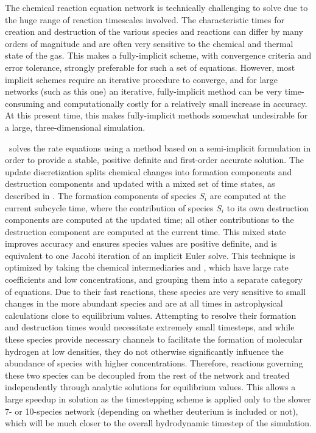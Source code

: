 The chemical reaction equation network is technically challenging to solve due
to the huge range of reaction timescales involved.  The characteristic times
for creation and destruction of the various species and reactions can differ by
many orders of magnitude and are often very sensitive to the chemical and
thermal state of the gas.  This makes a fully-implicit scheme, with convergence
criteria and error tolerance, strongly preferable for such a set of equations.
However, most implicit schemes require an iterative procedure to converge, and
for large networks (such as this one) an iterative, fully-implicit method can
be very time-consuming and computationally costly for a relatively small
increase in accuracy.  At this present time, this makes fully-implicit methods
somewhat undesirable for a large, three-dimensional simulation.

\enzo\ solves the rate equations using a method based on a semi-implicit
formulation in order to provide a stable, positive definite and first-order
accurate solution.  The update discretization splits chemical changes into
formation components and destruction components and updated with a mixed set of
time states, as described in \citet{anninos97}.  The formation components of
species $S_i$ are computed at the current subcycle time, where the contribution
of species $S_i$ to its own destruction components are computed at the updated
time; all other contributions to the destruction component are computed at the
current time.  This mixed state improves accuracy and ensures species values
are positive definite, and is equivalent to one Jacobi iteration of an implicit
Euler solve.  This technique is optimized by taking the chemical intermediaries
\Hm and \HHp, which have large rate coefficients and low concentrations, and
grouping them into a separate category of equations.  Due to their fast
reactions, these species are very sensitive to small changes in the more
abundant species and are at all times in astrophysical calculations close to
equilibrium values.  Attempting to resolve their formation and destruction
times would necessitate extremely small timesteps, and while these species
provide necessary channels to facilitate the formation of molecular hydrogen at
low densities, they do not otherwise significantly influence the abundance of
species with higher concentrations.  Therefore, reactions governing these two
species can be decoupled from the rest of the network and treated independently
through analytic solutions for equilibrium values.  This allows a large speedup
in solution as the timestepping scheme is applied only to the slower 7- or
10-species network (depending on whether deuterium is included or not), which
will be much closer to the overall hydrodynamic timestep of the simulation.


